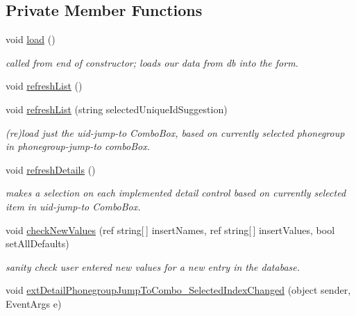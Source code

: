 \subsection*{Private Member Functions}
\begin{DoxyCompactItemize}
\item 
void \hyperlink{class_ias_pbx_config_1_1_extension_details_a9945d9c89ebedaed6d13fadc5bb5ad40}{load} ()
\begin{DoxyCompactList}\small\item\em called from end of constructor; loads our data from db into the form. \item\end{DoxyCompactList}\item 
void \hyperlink{class_ias_pbx_config_1_1_extension_details_a7a72ecc10cc4cf7cbb3c4f9c9b2098d7}{refreshList} ()
\item 
void \hyperlink{class_ias_pbx_config_1_1_extension_details_a64785a524e6fc2f62c0cd79e76a86709}{refreshList} (string selectedUniqueIdSuggestion)
\begin{DoxyCompactList}\small\item\em (re)load just the uid-\/jump-\/to ComboBox, based on currently selected phonegroup in phonegroup-\/jump-\/to comboBox. \item\end{DoxyCompactList}\item 
void \hyperlink{class_ias_pbx_config_1_1_extension_details_a43785b4be5bf7a2b2cb5cfe80e7aba06}{refreshDetails} ()
\begin{DoxyCompactList}\small\item\em makes a selection on each implemented detail control based on currently selected item in uid-\/jump-\/to ComboBox. \item\end{DoxyCompactList}\item 
void \hyperlink{class_ias_pbx_config_1_1_extension_details_ac7daf3d7399d8e980091c5f962f32b0c}{checkNewValues} (ref string\mbox{[}$\,$\mbox{]} insertNames, ref string\mbox{[}$\,$\mbox{]} insertValues, bool setAllDefaults)
\begin{DoxyCompactList}\small\item\em sanity check user entered new values for a new entry in the database. \item\end{DoxyCompactList}\item 
void \hyperlink{class_ias_pbx_config_1_1_extension_details_a3f677edf1360b568321649b161dd8738}{extDetailPhonegroupJumpToCombo\_\-SelectedIndexChanged} (object sender, EventArgs e)

\end{DoxyCompactItemize}

